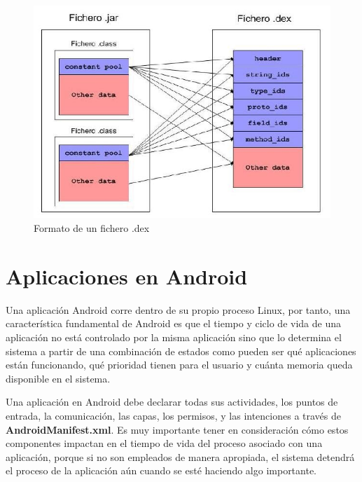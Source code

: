 \documentclass[letterpaper,12pt,openany,oneside]{book}
\begin{document}
\begin{figure}[!ht]
  \centering
    \includegraphics[width=1.1\textwidth\ ,angle=0]{ficheroDEX.JPG}
  \caption{Formato de un fichero .dex}
  \label{fig:Formato de un fichero .dex.}
\end{figure}

\section{Aplicaciones en Android}
Una aplicación Android corre dentro de su propio proceso Linux, por tanto, una característica fundamental de Android es que el tiempo y ciclo de vida de una aplicación no está controlado por la misma aplicación sino que lo determina el sistema a partir de una combinación de estados como pueden ser qué aplicaciones están funcionando, qué prioridad tienen para el usuario y cuánta memoria queda disponible en el sistema.

    Una aplicación en Android debe declarar todas sus actividades, los puntos de entrada, la comunicación, las capas, los permisos, y las intenciones a través de \textbf{AndroidManifest.xml}.  Es muy importante tener en consideración cómo estos componentes impactan en el tiempo de vida del proceso asociado con una aplicación, porque si no son empleados de manera apropiada, el sistema detendrá el proceso de la aplicación aún cuando se esté haciendo algo importante.
\end{document}
